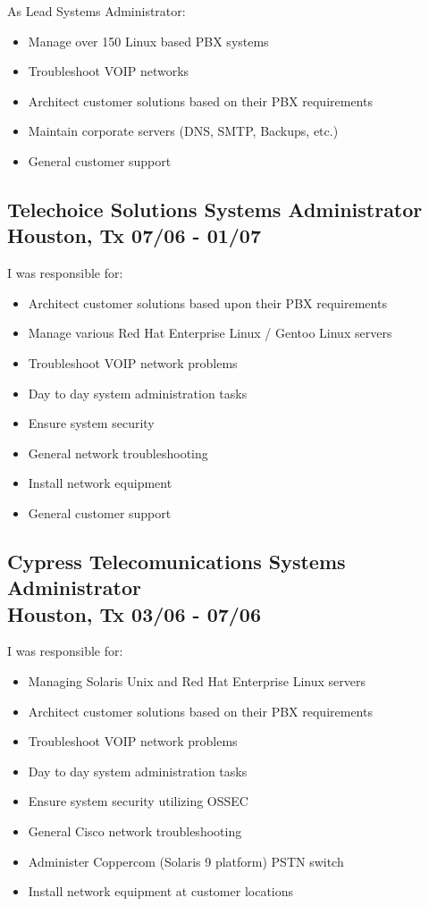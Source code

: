 \documentclass{article}
\begin{document}
  As Lead Systems Administrator:\\
  \begin{itemize}
  \item Manage over 150 Linux based PBX systems
  \item Troubleshoot VOIP networks
  \item Architect customer solutions based on their PBX requirements
  \item Maintain corporate servers (DNS, SMTP, Backups, etc.)
  \item General customer support
  \end{itemize}

  \subsection{Telechoice Solutions \hfill Systems Administrator\\
    Houston, Tx \hfill 07/06 - 01/07
  }

  I was responsible for:\\
  \begin{itemize}
  \item Architect customer solutions based upon their PBX requirements
  \item Manage various Red Hat Enterprise Linux / Gentoo Linux servers
  \item Troubleshoot VOIP network problems
  \item Day to day system administration tasks
  \item Ensure system security
  \item General network troubleshooting
  \item Install network equipment
  \item General customer support
  \end{itemize}

  \subsection{Cypress Telecomunications \hfill Systems Administrator\\
    Houston, Tx \hfill 03/06 - 07/06\\
  }

  I was responsible for:\\
  \begin{itemize}
  \item Managing Solaris Unix and Red Hat Enterprise Linux servers
  \item Architect customer solutions based on their PBX requirements
  \item Troubleshoot VOIP network problems
  \item Day to day system administration tasks
  \item Ensure system security utilizing OSSEC
  \item General Cisco network troubleshooting
  \item Administer Coppercom (Solaris 9 platform) PSTN switch
  \item Install network equipment at customer locations
  \end{itemize}
  
\end{document}

